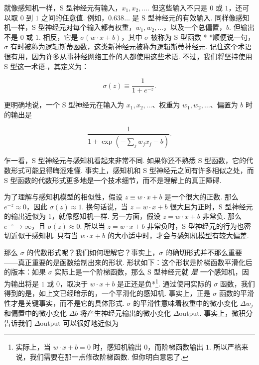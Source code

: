\noindent 就像感知机一样，S 型神经元有输入，$x_1, x_2, \ldots$. 但这些输入不只是 $0$ 或 $1$，还可以取 $0$ 到 $1$ 之间的任意值. 例如，$0.638\ldots$ 是 S 型神经元的有效输入. 同样像感知机一样，S 型神经元对每个输入都有权重，$w_1, w_2, \ldots$，以及一个总偏置，$b$. 但输出不是 $0$ 或 $1$. 相反，它是 $\sigma(w \cdot x+b)$，其中 $\sigma$ 被称为 S 型函数\label{term:18} * *顺便说一句，$\sigma$ 有时被称为逻辑斯蒂函数\label{term:19}，这类新神经元被称为逻辑斯蒂神经元. 记住这个术语很有用，因为许多从事神经网络工作的人都使用这些术语. 不过，我们将坚持使用 S 型这一术语.，其定义为：

\begin{equation}
\sigma(z) \equiv \frac{1}{1+e^{-z}}.
\tag{3}
\end{equation}

\noindent 更明确地说，一个 S 型神经元在输入为 $x_1,x_2,\ldots$、权重为 $w_1,w_2,\ldots$、偏置为 $b$ 时的输出是

\begin{equation}
\frac{1}{1+\exp(-\sum_j w_j x_j-b)}.
\tag{4}
\end{equation}

\noindent 乍一看，S 型神经元与感知机看起来非常不同. 如果你还不熟悉 S 型函数，它的代数形式可能显得晦涩难懂. 事实上，感知机和 S 型神经元之间有许多相似之处，而 S 型函数的代数形式更多地是一个技术细节，而不是理解上的真正障碍.

为了理解与感知机模型的相似性，假设 $z \equiv w \cdot x + b$ 是一个很大的正数. 那么 $e^{-z} \approx 0$，因此 $\sigma(z) \approx 1$. 换句话说，当 $z = w \cdot x+b$ 很大且为正时，S 型神经元的输出近似为 $1$，就像感知机一样. 另一方面，假设 $z = w \cdot x+b$ 非常负. 那么 $e^{-z} \rightarrow \infty$，且 $\sigma(z) \approx 0$. 所以当 $z = w \cdot x +b$ 非常负时，S 型神经元的行为也密切近似于感知机. 只有当 $w \cdot x+b$ 的大小适中时，才会与感知机模型有较大偏差.

那么 $\sigma$ 的代数形式呢？我们如何理解它？事实上，$\sigma$ 的确切形式并不那么重要——真正重要的是函数绘制出来的形状. 形状如下：这个形状是阶梯函数平滑化后的版本：如果 $\sigma$ 实际上是一个阶梯函数，那么 S 型神经元就 \emph{是} 一个感知机，因为输出将是 $1$ 或 $0$，取决于 $w\cdot x+b$ 是正还是负*\footnote{实际上，当 $w \cdot x +b = 0$ 时，感知机输出 $0$，而阶梯函数输出 $1$. 所以严格来说，我们需要在那一点修改阶梯函数. 但你明白意思了.}. 通过使用实际的 $\sigma$ 函数，我们得到的是，如上文已经暗示的，一个平滑化的感知机. 事实上，正是 $\sigma$ 函数的平滑性才是关键事实，而不是它的具体形式. $\sigma$ 的平滑性意味着权重中的微小变化 $\Delta w_j$ 和偏置中的微小变化 $\Delta b$ 将产生神经元输出的微小变化 $\Delta \mbox{output}$. 事实上，微积分告诉我们 $\Delta \mbox{output}$ 可以很好地近似为

